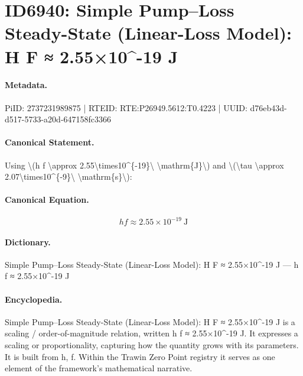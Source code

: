 \section*{ID6940: Simple Pump–Loss Steady-State (Linear-Loss Model): H F ≈ 2.55×10\textasciicircum{}-19 J}
\paragraph{Metadata.}
PiID: 2737231989875 | RTEID: RTE:P26949.5612:T0.4223 | UUID: d76eb43d-d517-5733-a20d-647158fc3366

\paragraph{Canonical Statement.}
Using \textbackslash{}(h f \textbackslash{}approx 2.55\textbackslash{}times10\textasciicircum{}\{-19\}\textbackslash{} \textbackslash{}mathrm\{J\}\textbackslash{}) and \textbackslash{}(\textbackslash{}tau \textbackslash{}approx 2.07\textbackslash{}times10\textasciicircum{}\{-9\}\textbackslash{} \textbackslash{}mathrm\{s\}\textbackslash{}):

\paragraph{Canonical Equation.}
\[
h f \approx 2.55\times10^{-19}\ \mathrm{J}
\]

\paragraph{Dictionary.}
Simple Pump–Loss Steady-State (Linear-Loss Model): H F ≈ 2.55×10\textasciicircum{}-19 J — h f ≈ 2.55×10\textasciicircum{}-19 J

\paragraph{Encyclopedia.}
Simple Pump–Loss Steady-State (Linear-Loss Model): H F ≈ 2.55×10\textasciicircum{}-19 J is a scaling / order-of-magnitude relation, written h f ≈ 2.55×10\textasciicircum{}-19 J. It expresses a scaling or proportionality, capturing how the quantity grows with its parameters. It is built from h, f. Within the Trawin Zero Point registry it serves as one element of the framework's mathematical narrative.
